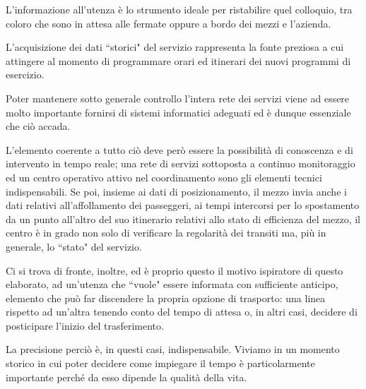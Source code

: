 L'informazione all'utenza è lo strumento ideale per ristabilire quel colloquio, tra coloro che sono in attesa alle fermate oppure a bordo dei mezzi e l'azienda.

L'acquisizione dei dati ``storici" del servizio rappresenta la fonte preziosa a cui attingere al momento di programmare orari ed itinerari dei nuovi programmi di esercizio.

Poter mantenere sotto generale controllo l'intera rete dei servizi viene ad essere molto importante fornirsi di sistemi informatici adeguati ed è dunque essenziale che ciò accada.

L'elemento coerente a tutto ciò deve però essere la possibilità di conoscenza e di intervento in tempo reale; una rete di servizi sottoposta a continuo monitoraggio ed un centro operativo attivo nel coordinamento sono gli elementi tecnici indispensabili.
Se poi, insieme ai dati di posizionamento, il mezzo invia anche i dati relativi all’affollamento dei passeggeri, ai tempi intercorsi per lo spostamento da un punto all'altro del suo itinerario relativi allo stato di efficienza del mezzo, il centro è in grado non solo di verificare la regolarità dei transiti ma, più in generale, lo ``stato" del servizio.

Ci si trova di fronte, inoltre, ed è proprio questo il motivo ispiratore di questo elaborato, ad un'utenza che ``vuole" essere informata con sufficiente anticipo, elemento che può far discendere la propria opzione di trasporto: una linea rispetto ad un'altra tenendo conto del tempo di attesa o, in altri casi, decidere di posticipare l'inizio del trasferimento.

La precisione perciò è, in questi casi, indispensabile. Viviamo in un momento storico in cui poter decidere come impiegare il tempo è particolarmente importante perché da esso dipende la qualità della vita.

